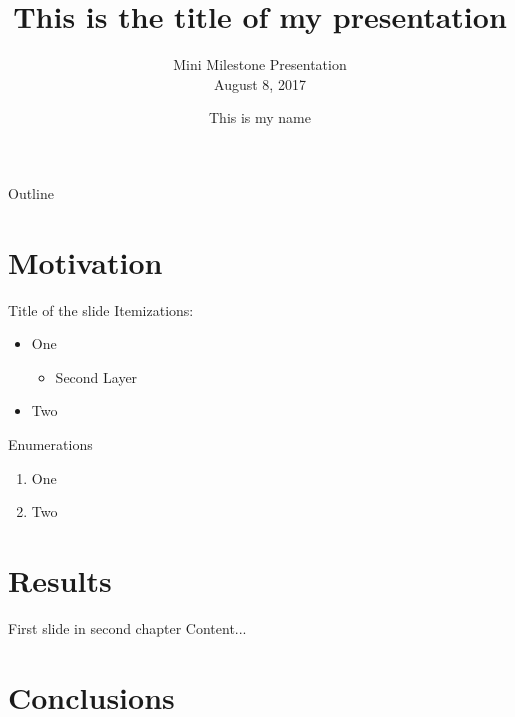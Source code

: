 \documentclass[aspectratio=1610]{beamer}
\title{This is the title of my presentation} %
\author{This is my name}
\subtitle{Mini Milestone Presentation\\ August 8, 2017}
\begin{document}
\maketitle

\begin{frame}{Outline}
\tableofcontents
\end{frame}

\section{Motivation}

\begin{frame}{Title of the slide}
Itemizations:
\begin{itemize}
	\item One
	\begin{itemize}
		\item Second Layer
	\end{itemize}	
	\item Two
\end{itemize}

Enumerations
\begin{enumerate}
	\item One
	\item Two
\end{enumerate}
\end{frame}

\section{Results}

\begin{frame}{First slide in second chapter}
Content...
\end{frame}

\section{Conclusions}

\end{document}
